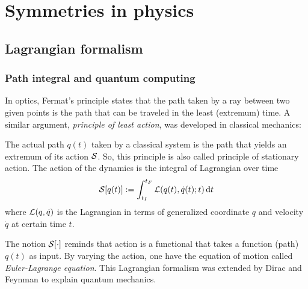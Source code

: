 \section{Symmetries in physics}
\subsection{Lagrangian formalism}\label{sec:lagrangian}
\subsubsection{Path integral and quantum computing}
\cite{xuLagrangianFormalismQuantum2021}
In optics, Fermat's principle states that the path taken by a ray between two given points is the path that can be traveled in the least (extremum) time. 
A similar argument, \emph{principle of least action}, was developed in classical mechanics:
\begin{axiom}\label{thm:least_action}
    The actual path $q(t)$ taken by a classical system is the path that 
	yields an extremum of its action \(\mathcal{S}\).
	So, this principle is also called principle of stationary action.
	The action of the dynamics is the integral of Lagrangian over time
	\begin{equation}
		\mathcal{S}[q(t)]:=\int_{t_I}^{t_F}\mathcal{L}(q(t),\dot{q}(t);t)\dd{t}
		\label{eq:action}
	\end{equation}
	where $\mathcal{L}(q,\dot{q})$ is the Lagrangian in terms of generalized coordinate $q$ and velocity $\dot{q}$ at certain time $t$. 
\end{axiom}
The notion $\mathcal{S}[\cdot]$ reminds that action is a functional that takes a function (path) $q(t)$ as input.
By varying the action, one have the equation of motion 
called \emph{Euler-Lagrange equation}.
This Lagrangian formalism was extended by Dirac \cite{diracAnalogyClassicalQuantum1945} and Feynman \cite{feynmanQuantumMechanicsPath2010} to explain quantum mechanics. 
